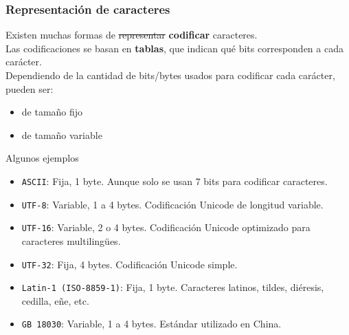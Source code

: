 \documentclass[aspectratio=169]{beamer}
\begin{document}
\begin{frame}[fragile,t] 
    \frametitle{Representación de caracteres}
    Existen muchas formas de \sout{representar} \textbf{codificar} caracteres.\\
    \bigskip
    Las codificaciones se basan en \textbf{tablas}, que indican qué bits corresponden a cada carácter.\\
    \bigskip
    Dependiendo de la cantidad de bits/bytes usados para codificar cada carácter, pueden ser:\\
    \begin{itemize}
     \item de tamaño fijo
     \item de tamaño variable
    \end{itemize}
    Algunos ejemplos
    \begin{itemize}
     \item \small \textcolor{naranjauca}{\texttt{ASCII}}: {\small Fija, 1 byte. Aunque solo se usan 7 bits para codificar caracteres.}
     \item \small \textcolor{naranjauca}{\texttt{UTF-8}}: {\small Variable, 1 a 4 bytes. Codificación Unicode de longitud variable.}
     \item \small \textcolor{naranjauca}{\texttt{UTF-16}}: {\small Variable, 2 o 4 bytes. Codificación Unicode optimizado para caracteres multilingües.}
     \item \small \textcolor{naranjauca}{\texttt{UTF-32}}: {\small Fija, 4 bytes. Codificación Unicode simple.}
     \item \small \textcolor{naranjauca}{\texttt{Latin-1 (ISO-8859-1)}}: {\small Fija, 1 byte. Caracteres latinos, tildes, diéresis, cedilla, eñe, etc.}
     \item \small \textcolor{naranjauca}{\texttt{GB 18030}}: {\small Variable, 1 a 4 bytes. Estándar utilizado en China.}
    \end{itemize}
\end{frame}
\end{document}
